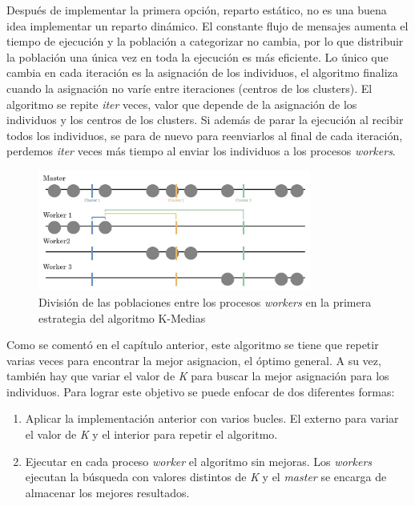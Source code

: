 	
		
		Después de implementar la primera opción, reparto estático, no es una buena idea implementar un reparto dinámico. El constante flujo de mensajes aumenta el tiempo de ejecución y la población a categorizar no cambia, por lo que distribuir la población una única vez en toda la ejecución es más eficiente. Lo único que cambia en cada iteración es la asignación de los individuos, el algoritmo finaliza cuando la asignación no varíe entre iteraciones (centros de los clusters). El algoritmo se repite \textit{iter} veces, valor que depende de la asignación de los individuos y los centros de los clusters. Si además de parar la ejecución al recibir todos los individuos, se para de nuevo para reenviarlos al final de cada iteración, perdemos \textit{iter} veces más tiempo al enviar los individuos a los procesos \textit{workers}. 
		
		
		\begin{figure} [!h]
			\centering
			\includegraphics[width=0.8\textwidth]{images/chapter_3/kmedias_mpi}	
			\caption{División de las poblaciones entre los procesos \textit{workers} en la primera estrategia del algoritmo K-Medias}
			\label{fig:kmediasdiv}
		\end{figure}
		
		\newpage
		
		Como se comentó en el capítulo anterior, este algoritmo se tiene que repetir varias veces para encontrar la mejor asignacion, el óptimo general. A su vez, también hay que variar el valor de \textit{K} para buscar la mejor asignación para los individuos. Para lograr este objetivo se puede enfocar de dos diferentes formas:
		
		\begin{enumerate}
			\item Aplicar la implementación anterior con varios bucles. El externo para variar el valor de \textit{K} y el interior para repetir el algoritmo.
			\item Ejecutar en cada proceso \textit{worker} el algoritmo sin mejoras. Los \textit{workers} ejecutan la búsqueda con valores distintos de \textit{K} y el \textit{master} se encarga de almacenar los mejores resultados.
		\end{enumerate}
		

